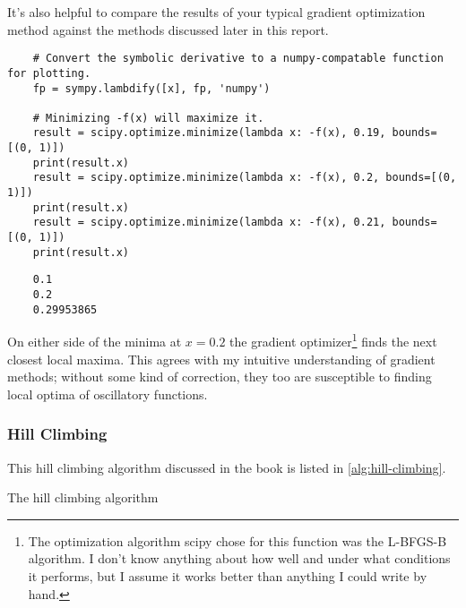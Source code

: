 \documentclass{article}
\begin{document}
It's also helpful to compare the results of your typical gradient optimization method against the
methods discussed later in this report.

\begin{verbatim}
    # Convert the symbolic derivative to a numpy-compatable function for plotting.
    fp = sympy.lambdify([x], fp, 'numpy')

    # Minimizing -f(x) will maximize it.
    result = scipy.optimize.minimize(lambda x: -f(x), 0.19, bounds=[(0, 1)])
    print(result.x)
    result = scipy.optimize.minimize(lambda x: -f(x), 0.2, bounds=[(0, 1)])
    print(result.x)
    result = scipy.optimize.minimize(lambda x: -f(x), 0.21, bounds=[(0, 1)])
    print(result.x)
\end{verbatim}
\vspace{-1cm}
\begin{verbatim}
    0.1
    0.2
    0.29953865
\end{verbatim}
\vspace{-1cm}

On either side of the minima at $x = 0.2$ the gradient optimizer\footnote{The optimization
    algorithm scipy chose for this function was the L-BFGS-B algorithm. I don't know anything about
    how well and under what conditions it performs, but I assume it works better than anything I
    could write by hand.} finds the next closest local maxima. This agrees with my intuitive
understanding of gradient methods; without some kind of correction, they too are susceptible to
finding local optima of oscillatory functions.

\subsubsection{Hill Climbing}

This hill climbing algorithm discussed in the book is listed in \autoref{alg:hill-climbing}.

\begin{algorithm}[h]
    \begin{algorithmic}
                \EndIf{}
            \EndWhile{}
            \State{}
        \EndFunction{}
    \end{algorithmic}
    \caption{The hill climbing algorithm}\label{alg:hill-climbing}
\end{algorithm}
\end{document}
